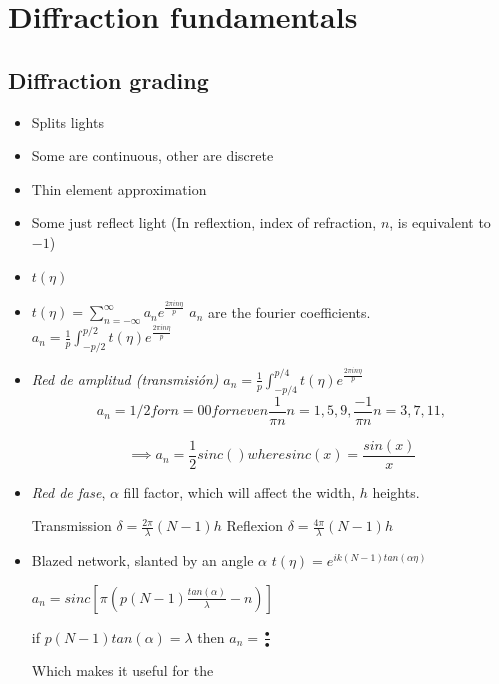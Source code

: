 \documentclass[../main/main.tex]{subfiles}
\begin{document}
\chapter{Diffraction fundamentals}
\section{Diffraction grading}

\begin{itemize}
	\item Splits lights
	\item Some are continuous, other are discrete
	\item Thin element approximation
	\item Some just reflect light (In reflextion, index of refraction, $n$, is equivalent to $-1$)
	\item $t(\eta)$
	\item $t(\eta) = \sum_{n=-\infty}^{\infty} a_{n}e^{\frac{2\pi i n \eta}{p}}$
	$a_{n}$ are the fourier coefficients. $a_{n} = \frac{1}{p}\int_{-p/2}^{p/2} t(\eta)e^{\frac{2\pi i n \eta}{p}}$
	\item \emph{Red de amplitud (transmisión)} $a_{n} =  \frac{1}{p}\int_{-p/4}^{p/4} t(\eta)e^{\frac{2\pi i n \eta}{p}}$
	\begin{equation}
	a_{n} = 1/2 for n = 0
	0 for n even
	\frac{1}{\pi n} n = 1, 5, 9,
	\frac{-1}{\pi n} n = 3, 7, 11,
	\end{equation}

	\begin{equation}
	\implies a_{n} = \frac{1}{2} sinc()   where sinc(x) = \frac{sin(x)}{x}
	\end{equation}

	\item \emph{Red de fase}, $\alpha$ fill factor, which will affect the width, $h$ heights.

	Transmission $\delta =  \frac{2 \pi }{\lambda} (N-1)h$
	Reflexion $\delta =  \frac{4 \pi }{\lambda} (N-1)h$
	\item Blazed network, slanted by an angle $\alpha$
	$t(\eta) = e^{i k (N-1) tan (\alpha \eta)}$

	$a_{n} = sinc\left[\pi \left(p (N-1) \frac{tan (\alpha)}{\lambda} - n\right)\right]$

	if $p(N-1) tan(\alpha) = \lambda$ then $a_{n} = \frac{•}{•}$

	Which makes it useful for the

\end{itemize}
\end{document}
